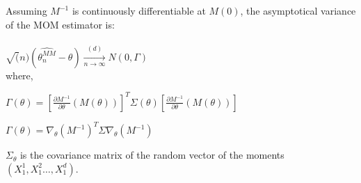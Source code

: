 Assuming $M^{-1}$ is continuously differentiable at $M(0)$, the asymptotical variance of the MOM estimator is:\\\\

$\sqrt(n)(\widehat{\theta_n^{MM}} - \theta) \xrightarrow[n \rightarrow \infty]{(d)} N(0,\Gamma)$\\

where,

$\Gamma (\theta )=\left[\frac{\partial M^{-1}}{\partial \theta } (M(\theta ))\right]^{T} \Sigma (\theta )\left[\frac{\partial M^{-1}}{\partial \theta } (M(\theta ))\right]$

$\Gamma(\theta) = \nabla_{\theta}(M^{-1})^{T} \Sigma \nabla_{\theta}(M^{-1}) $

$\Sigma_{\theta}$ is the covariance matrix of the random vector of the moments $(X_1^1,X_1^2 \ldots, X_1^d)$.